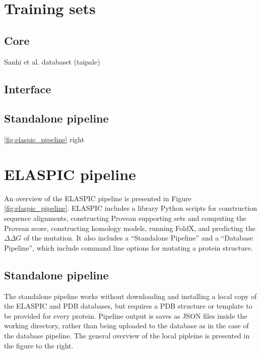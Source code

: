 

\section{Training sets}

\subsection{Core}

Sanhi et al. databaset (taipale)

\subsection{Interface}


\subsection{Standalone pipeline}

\ref{fig:elaspic_pipeline} right

\section{ELASPIC pipeline}

An overview of the ELASPIC pipeline is presented in Figure \ref{fig:elaspic_pipeline}. ELASPIC includes a library Python scripts for construction sequence alignments, constructing Provean supporting sets and computing the Provean score, constructing homology models, running FoldX, and predicting the $\Delta \Delta G$ of the mutation. It also includes a ``Standalone Pipeline'' and a ``Database Pipeline'', which include command line options for mutating a protein structure.


\subsection{Standalone pipeline}

The standalone pipeline works without downloading and installing a local copy of the ELASPIC and PDB databases, but requires a PDB structure or template to be provided for every protein. Pipeline output is saves as JSON files inside the working directory, rather than being uploaded to the database as in the case of the database pipeline. The general overview of the local pipleine is presented in the figure to the right.

